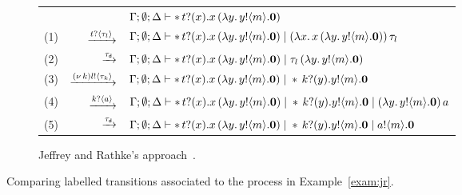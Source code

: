 \begin{example}
\begin{figure}
\bigskip

\begin{subfigure}[t]{\textwidth}
		\begin{tabular}{rrl}
		 & & $\Gamma; \emptyset; \Delta \vdash \ast\,{} t ? (x) . x\, {(}\lambda y.\,y ! \langle m \rangle . \mathbf{0}) $
		 \\
		(1) &$\xrightarrow{t ? \langle \tau_l \rangle}$& $\Gamma; \emptyset; \Delta \vdash \ast\,{} t ? (x) . x\, {(}\lambda y.\,y ! \langle m \rangle . \mathbf{0}) \;|\; (\lambda x.\,x\, {(}\lambda y.\,y ! \langle m \rangle . \mathbf{0}))\, {\tau_l}$\\
		(2) &$\xrightarrow{\tau_{\mathsf{d}}}$& $\Gamma; \emptyset; \Delta \vdash \ast\,{} t ? (x) . x\, {(}\lambda y.\,y ! \langle m \rangle . \mathbf{0}) \;|\; \tau_l\, {(\lambda y.\,y ! \langle m \rangle . \mathbf{0})}$\\
		(3) &$\xrightarrow{(\nu\, k) l ! \langle \tau_k \rangle}$& $\Gamma; \emptyset; \Delta \vdash \ast\,{} t ? (x) . x\, {(}\lambda y.\,y ! \langle m \rangle . \mathbf{0}) \;|\; \ast\,{} k ? (y) . y ! \langle m \rangle . \mathbf{0} $\\
		(4) &$\xrightarrow{k ? \langle a \rangle}$& $\Gamma; \emptyset; \Delta \vdash \ast\,{} t ? (x) . x\, {(}\lambda y.\,y ! \langle m \rangle . \mathbf{0}) \;|\; \ast\,{} k ? (y) . y ! \langle m \rangle . \mathbf{0} \;|\; (\lambda y.\,y ! \langle m \rangle . \mathbf{0})\, {a}$\\
		(5) &$\xrightarrow{\tau_{\mathsf{d}}}$& $\Gamma; \emptyset; \Delta \vdash \ast\,{} t ? (x) . x\, {(}\lambda y.\,y ! \langle m \rangle . \mathbf{0}) \;|\; \ast\,{} k ? (y) . y ! \langle m \rangle . \mathbf{0} \;|\; a ! \langle m \rangle . \mathbf{0}$
	\end{tabular}
\caption{Jeffrey and Rathke's approach~\cite{JeffreyR05}.}\label{tablejr:2}
	\end{subfigure}
\caption{Comparing labelled transitions associated to the process in Example~\ref{exam:jr}.\label{f:comparison} }
\end{figure}


\end{example}

